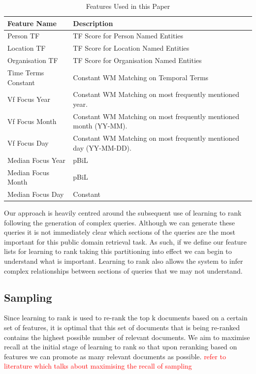 \documentclass{mpaper}
\newcommand{\remove}[1]{\textcolor{red}{#1}}
\begin{document}
\begin{table}[t] 
\centering
\begin{tabular}{|p{4cm}|p{6cm}|}
\hline
Feature Name 		& Description  \\ \hline
Person TF 			
& TF Score for Person Named Entities 		\\ \hline
Location TF 		
& TF Score for Location Named Entities 		\\ \hline
Organisation TF 	
& TF Score for Organisation Named Entities  \\ \hline
Time Terms Constant 
& Constant WM Matching on Temporal Terms    \\ \hline
Vf Focus Year 		
& Constant WM Matching on most frequently mentioned year. \\ \hline
Vf Focus Month 		
&Constant WM Matching on most frequently mentioned month (YY-MM). \\ \hline
Vf Focus Day 		
& Constant WM Matching on most frequently mentioned day (YY-MM-DD).\\ \hline
Median Focus Year 	
& pBiL 		  \\ \hline
Median Focus Month 	
& pBiL 		  \\ \hline
Median Focus Day 	
& Constant 	  \\ \hline
\end{tabular}
\caption{Features Used in this Paper}
\label{table:features}
\end{table}

Our approach is heavily centred around the subsequent use of learning to rank following the generation of complex queries.
Although we can generate these queries it is not immediately clear which sections of the queries are the most important for this public domain retrieval task.
As such, if we define our feature lists for learning to rank taking this partitioning into effect we can begin to understand what is important.
Learning to rank also allows the system to infer complex relationships between sections of queries that we may not understand.

\subsection{Sampling}
Since learning to rank is used to re-rank the top k documents based on a certain set of features, it is optimal that this set of documents that is being re-ranked contains the highest possible number of relevant documents.
We aim to maximise recall at the initial stage of learning to rank so that upon reranking based on features we can promote as many relevant documents as possible.
\remove{refer to literature which talks about maximising the recall of sampling}
\end{document}
